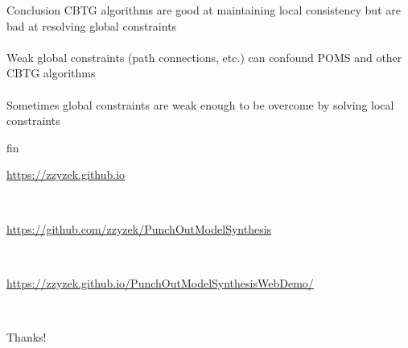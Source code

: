 \documentclass{beamer}
\begin{document}
  \begin{frame}[fragile]{Conclusion}
    CBTG algorithms are good at maintaining local consistency but are bad at resolving global constraints \\
    \hfill \\
    Weak global constraints (path connections, etc.) can confound POMS and other CBTG algorithms \\
    \hfill \\
    Sometimes global constraints are weak enough to be overcome by solving local constraints
  \end{frame}

  \begin{frame}[fragile]{fin}
    \begin{center}\url{https://zzyzek.github.io}\end{center}
    \hfill \\
    \begin{center}\url{https://github.com/zzyzek/PunchOutModelSynthesis}\end{center}
    \hfill \\
    \begin{center}\small\url{https://zzyzek.github.io/PunchOutModelSynthesisWebDemo/}\end{center}
    \hfill \\
    \begin{center}Thanks!\end{center}
  \end{frame}

  \appendix
\end{document}
